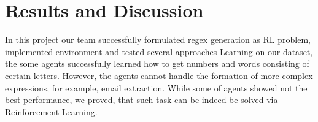 \documentclass{article}
\begin{document}
\section{Results and Discussion}

In this project our team successfully formulated regex generation as RL problem, implemented environment and tested several approaches Learning on our dataset, the some agents successfully learned how to get numbers and words consisting of certain letters. However, the agents cannot handle the formation of more complex expressions, for example, email extraction. While some of agents showed not the best performance, we proved, that such task can be indeed be solved via Reinforcement Learning.






\end{document}

